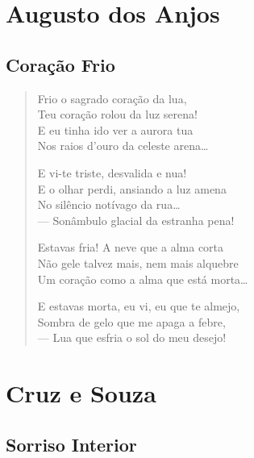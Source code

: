 \documentclass[10pt,a5paper,oneside]{book}
\begin{document}
\part{Augusto dos Anjos}

\chapter{Coração Frio}

\begin{verse}
Frio o sagrado coração da lua,\\
Teu coração rolou da luz serena!\\
E eu tinha ido ver a aurora tua\\
Nos raios d'ouro da celeste arena\ldots{}

E vi-te triste, desvalida e nua!\\
E o olhar perdi, ansiando a luz amena\\
No silêncio notívago da rua\ldots{}\\
--- Sonâmbulo glacial da estranha pena!

Estavas fria! A neve que a alma corta\\
Não gele talvez mais, nem mais alquebre\\
Um coração como a alma que está morta\ldots{}

E estavas morta, eu vi, eu que te almejo,\\
Sombra de gelo que me apaga a febre,\\
--- Lua que esfria o sol do meu desejo!
\end{verse}

\part{Cruz e Souza}

\chapter{Sorriso Interior}
\end{document}
